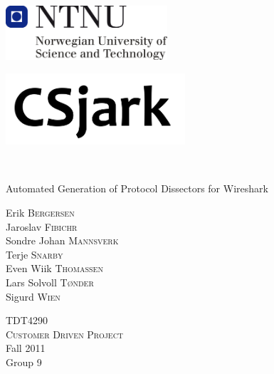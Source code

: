 
\begin{titlepage}
\begin{center}

\includegraphics[width=0.45\textwidth]{./img/NTNU-logo.png}\\[6cm]    


\begin{flushleft}
\includegraphics[width=0.5\textwidth]{./img/CSjark.png}
\end{flushleft}

\HRule \\[0.2cm]

\begin{flushright}
{ \Large Automated Generation of Protocol Dissectors for Wireshark}\\
\end{flushright}



\vfill

\begin{minipage}{0.45\linewidth}
\begin{flushleft} 
Erik \textsc{Bergersen}\\
Jaroslav \textsc{Fibichr}\\
Sondre Johan \textsc{Mannsverk}\\
Terje \textsc{Snarby}\\
Even Wiik \textsc{Thomassen}\\
Lars Solvoll \textsc{T\o nder}\\
Sigurd \textsc{Wien}
\end{flushleft}
\end{minipage}
\begin{minipage}{0.45\linewidth}
\begin{flushright} 
\textsc{TDT4290}\\
\textsc{Customer Driven Project}\\[1.5cm]
Fall 2011\\
Group 9
\end{flushright}
\end{minipage}




\end{center}
\end{titlepage}